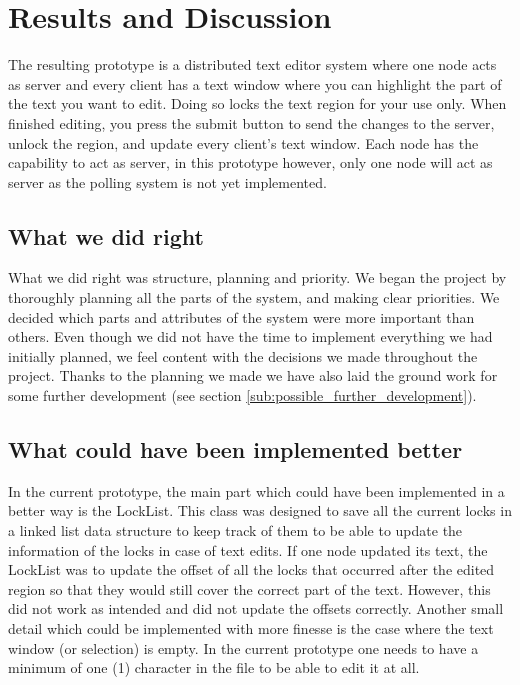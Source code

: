 \documentclass[12pt]{article}
\begin{document}

\section{Results and Discussion} %
\label{sec:results_and_discussion}
The resulting prototype is a distributed text editor system where one node acts as server and every client has a text window where you can highlight the part of the text you want to edit. Doing so locks the text region for your use only. When finished editing, you press the submit button to send the changes to the server, unlock the region, and update every client's text window. Each node has the capability to act as server, in this prototype however, only one node will act as server as the polling system is not yet implemented. 

\subsection{What we did right} %
\label{sub:what_we_did_right}
What we did right was structure, planning and priority. We began the project by thoroughly planning all the parts of the system, and making clear priorities. We decided which parts and attributes of the system were more important than others. Even though we did not have the time to implement everything we had initially planned, we feel content with the decisions we made throughout the project. Thanks to the planning we made we have also laid the ground work for some further development (see section \ref{sub:possible_further_development}). 


\subsection{What could have been implemented better} %
\label{sub:what_could_have_been_implemented_better}
In the current prototype, the main part which could have been implemented in a better way is the LockList. This class was designed to save all the current locks in a linked list data structure to keep track of them to be able to update the information of the locks in case of text edits. If one node updated its text, the LockList was to update the offset of all the locks that occurred after the edited region so that they would still cover the correct part of the text. However, this did not work as intended and did not update the offsets correctly. Another small detail which could be implemented with more finesse is the case where the text window (or selection) is empty. In the current prototype one needs to have a minimum of one (1) character in the file to be able to edit it at all. 
\end{document}
